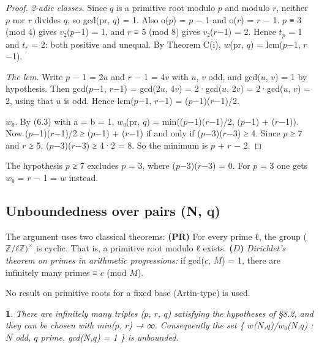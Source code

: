 \documentclass[pdflatex,sn-mathphys-num]{sn-jnl}
\theoremstyle{thmstyleone}
\newcommand{\thmxname}{}
\newtheorem*{thmxinner}{\thmxname}
\newenvironment{thmx}[1]{\renewcommand{\thmxname}{#1}\begin{thmxinner}}{\end{thmxinner}}
\theoremstyle{thmstylethree}
\begin{document}
\begin{proof}[Proof]

\emph{2-adic classes.} Since \(q\) is a primitive root modulo \(p\) and modulo \(r\), neither \(p\) nor \(r\) divides \(q\), so gcd(pr, \(q\)) = 1. Also o(\(p\)) = \(p\) − 1 and o(\(r\)) = \(r\) − 1. \(p\) ≡ 3 (mod 4) gives \(v\)₂(\(p\)−1) = 1, and \(r\) ≡ 5 (mod 8) gives \(v\)₂(\(r\)−1) = 2. Hence \(t_p\) = 1 and \(t_r\) = 2: both positive and unequal. By Theorem C(i), \(w\)(pr, \(q\)) = lcm(\(p\)−1, \(r\)−1).

\emph{The lcm.} Write \(p\) − 1 = 2\(u\) and \(r\) − 1 = 4\(v\) with \(u\), \(v\) odd, and gcd(\(u\), \(v\)) = 1 by hypothesis. Then gcd(\(p\)−1, \(r\)−1) = gcd(2\(u\), 4\(v\)) = 2·gcd(\(u\), 2\(v\)) = 2·gcd(\(u\), \(v\)) = 2, using that \(u\) is odd. Hence lcm(\(p\)−1, \(r\)−1) = (\(p\)−1)(\(r\)−1)/2.

\emph{\(w\)₀.} By (6.3) with a = b = 1, \(w\)₀(pr, \(q\)) = min((\(p\)−1)(\(r\)−1)/2, (\(p\)−1) + (\(r\)−1)). Now (\(p\)−1)(\(r\)−1)/2 ≥ (\(p\)−1) + (\(r\)−1) if and only if (\(p\)−3)(\(r\)−3) ≥ 4. Since \(p\) ≥ 7 and \(r\) ≥ 5, (\(p\)−3)(\(r\)−3) ≥ 4·2 = 8. So the minimum is \(p\) + \(r\) − 2.

\end{proof}

The hypothesis \(p\) ≥ 7 excludes \(p\) = 3, where (\(p\)−3)(\(r\)−3) = 0. For \(p\) = 3 one gets \(w\)₀ = \(r\) − 1 = \(w\) instead.

\subsection{Unboundedness over pairs (N, q)}

The argument uses two classical theorems: \textbf{(PR)} For every prime ℓ, the group (\(ℤ/ℓℤ)^×\) is cyclic. That is, a primitive root modulo ℓ exists. \textbf{(\(D\))} \emph{Dirichlet's theorem on primes in arithmetic progressions:} if gcd(\(c\), \(M\)) = 1, there are infinitely many primes ≡ \(c\) (mod \(M\)).

No result on primitive roots for a fixed base (Artin-type) is used.

\begin{thmx}{Theorem C (ii), second part}

There are infinitely many triples (\(p\), \(r\), \(q\)) satisfying the hypotheses of §8.2, and they can be chosen with min(\(p\), \(r\)) → ∞. Consequently the set \{ \(w\)(\(N\),\(q\))/\(w\)₀(\(N\),\(q\)) : \(N\) odd, \(q\) prime, gcd(\(N\),\(q\)) = 1 \} is unbounded.

\end{thmx}
\end{document}

